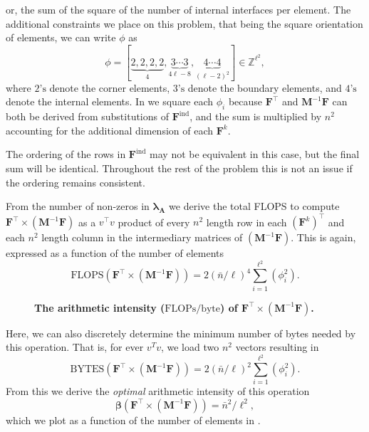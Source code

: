 or, the sum of the square of the number of internal interfaces per element. 
The additional constraints we place on this problem, that being the square orientation of elements, we can write $\phi$ as 
\begin{equation}
	\phi = \left[ \underbrace{2, 2, 2, 2}_{4}, \underbrace{3 \cdots 3}_{4\ell - 8}, \underbrace{4 \cdots 4}_{(\ell-2)^2} \right] \in \mathbb{Z}^{\ell^2}, 
\end{equation}
where $2\text{'s}$ denote the corner elements, $3\text{'s}$ denote the boundary elements, and $4\text{'s}$ denote the internal elements. 
In  we square each $\phi_i$ because $\textbf{F}^{\intercal}$ and  $\textbf{M}^{-1}\textbf{F}$ can both be derived from substitutions of $\textbf{F}^{\text{ind}}$, and the sum is multiplied by $n^2$ accounting for the additional dimension of each $\textbf{F}^k$. 

%
%
%
The ordering of the rows in $\textbf{F}^{\text{ind}}$ may not be equivalent in this case, but the final sum will be identical. 
Throughout the rest of the problem this is not an issue if the ordering remains consistent. 

%
%
%
From the number of non-zeros in $\symbf{\lambda}_\textbf{A}$ we derive the total FLOPS to compute $\textbf{F}^{\intercal} \times (\textbf{M}^{-1}\textbf{F})$ as a $v^\intercal v$ product of every $n^2$ length row in each $(\textbf{F}^k)^{\intercal}$ and each $n^2$ length column in the intermediary matrices of $(\textbf{M}^{-1}\textbf{F})$.
This is again, expressed as a function of the number of elements
\begin{equation}
	\text{FLOPS}(\textbf{F}^{\intercal} \times (\textbf{M}^{-1}\textbf{F})) = 2 (\bar{n}/\ell)^4 \sum_{i=1}^{\ell^2} (\phi_i^2).
\end{equation}

%
%
%
\begin{figure}
	{\centering 
	}
	\caption{\textbf{The arithmetic intensity ($\text{FLOPs}/\text{byte}$) of $\textbf{F}^\intercal \times (\textbf{M}^{-1} \textbf{F})$.}}
	\label{fig:ftmt_ai}
\end{figure}

\noindent
Here, we can also discretely determine the minimum number of bytes needed by this operation. 
That is, for ever $v^Tv$, we load two $n^2$ vectors resulting in 
\begin{equation}
	\text{BYTES}(\textbf{F}^{\intercal} \times (\textbf{M}^{-1}\textbf{F})) = 2 (\bar{n}/\ell)^2 \sum_{i=1}^{\ell^2} (\phi_i^2).
\end{equation}
\noindent 
From this we derive the \emph{optimal} arithmetic intensity of this operation  
\begin{equation}
	\symbf{\beta}(\textbf{F}^{\intercal} \times (\textbf{M}^{-1}\textbf{F})) = \bar{n}^2 / \ell^2,
\end{equation}
\noindent
which we plot as a function of the number of elements in .


